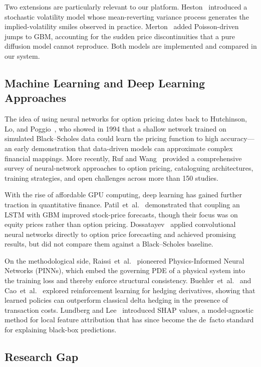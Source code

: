 \documentclass[conference]{IEEEtran}
\begin{document}
Two extensions are particularly relevant to our platform. Heston~\cite{b18} introduced a stochastic volatility model whose mean-reverting variance process generates the implied-volatility smiles observed in practice. Merton~\cite{b2} added Poisson-driven jumps to GBM, accounting for the sudden price discontinuities that a pure diffusion model cannot reproduce. Both models are implemented and compared in our system.

\subsection{Machine Learning and Deep Learning Approaches}

The idea of using neural networks for option pricing dates back to Hutchinson, Lo, and Poggio~\cite{b25}, who showed in 1994 that a shallow network trained on simulated Black--Scholes data could learn the pricing function to high accuracy---an early demonstration that data-driven models can approximate complex financial mappings. More recently, Ruf and Wang~\cite{b26} provided a comprehensive survey of neural-network approaches to option pricing, cataloguing architectures, training strategies, and open challenges across more than 150 studies.

With the rise of affordable GPU computing, deep learning has gained further traction in quantitative finance. Patil~et~al.~\cite{b15} demonstrated that coupling an LSTM with GBM improved stock-price forecasts, though their focus was on equity prices rather than option pricing. Dossatayev~\cite{b17} applied convolutional neural networks directly to option price forecasting and achieved promising results, but did not compare them against a Black--Scholes baseline.

On the methodological side, Raissi~et~al.~\cite{b19} pioneered Physics-Informed Neural Networks (PINNs), which embed the governing PDE of a physical system into the training loss and thereby enforce structural consistency. Buehler~et~al.~\cite{b20} and Cao~et~al.~\cite{b21} explored reinforcement learning for hedging derivatives, showing that learned policies can outperform classical delta hedging in the presence of transaction costs. Lundberg and Lee~\cite{b22} introduced SHAP values, a model-agnostic method for local feature attribution that has since become the de~facto standard for explaining black-box predictions.

\subsection{Research Gap}
\end{document}
